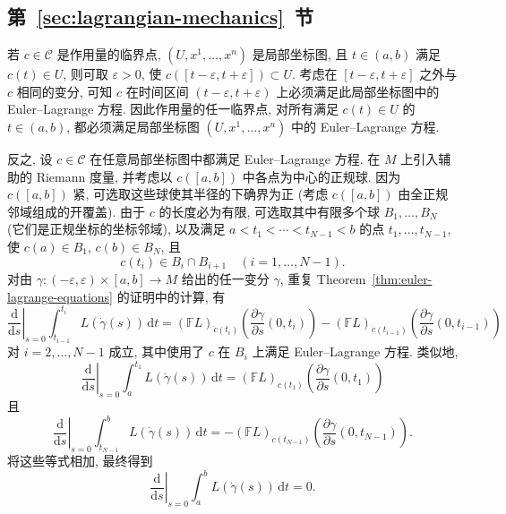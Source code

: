 \subsection{\texorpdfstring{第~\ref{sec:lagrangian-mechanics}~节}{Lagrange 力学}}\label{subsec:solutions-lagrangian-mechanics}

\begin{description}[font=\normalfont,leftmargin=2em,labelwidth=1.5em]
若 $c\in\mathcal C$ 是作用量的临界点, $(U,x^1,\ldots,x^n)$ 是局部坐标图, 且 $t\in(a,b)$ 满足 $c(t)\in U$, 则可取 $\varepsilon>0$, 使 $c([t-\varepsilon,t+\varepsilon])\subset U$. 考虑在 $[t-\varepsilon,t+\varepsilon]$ 之外与 $c$ 相同的变分, 可知 $c$ 在时间区间 $(t-\varepsilon,t+\varepsilon)$ 上必须满足此局部坐标图中的 Euler–Lagrange 方程. 因此作用量的任一临界点, 对所有满足 $c(t)\in U$ 的 $t\in(a,b)$, 都必须满足局部坐标图 $(U,x^1,\ldots,x^n)$ 中的 Euler–Lagrange 方程.

反之, 设 $c\in\mathcal C$ 在任意局部坐标图中都满足 Euler–Lagrange 方程. 在 $M$ 上引入辅助的 Riemann 度量, 并考虑以 $c([a,b])$ 中各点为中心的正规球. 因为 $c([a,b])$ 紧, 可选取这些球使其半径的下确界为正 (考虑 $c([a,b])$ 由全正规邻域组成的开覆盖). 由于 $c$ 的长度必为有限, 可选取其中有限多个球 $B_1,\ldots,B_N$ (它们是正规坐标的坐标邻域), 以及满足 $a<t_1<\cdots<t_{N-1}<b$ 的点 $t_1,\ldots,t_{N-1}$, 使 $c(a)\in B_1$, $c(b)\in B_N$, 且
\[
  c(t_i)\in B_i\cap B_{i+1}\quad(i=1,\ldots,N-1).
\]
对由 $\gamma:(-\varepsilon,\varepsilon)\times[a,b]\to M$ 给出的任一变分 $\gamma$, 重复 Theorem~\ref{thm:euler-lagrange-equations} 的证明中的计算, 有
\[
  \left.\frac{\mathrm{d}}{\mathrm{d}s}\right|_{s=0}
     \int_{t_{i-1}}^{t_i}L(\dot\gamma(s))\,\mathrm{d}t
    =(\mathbb FL)_{\dot c(t_i)}\left(\frac{\partial\gamma}{\partial s}(0,t_i)\right)
     -(\mathbb FL)_{\dot c(t_{i-1})}\left(\frac{\partial\gamma}{\partial s}(0,t_{i-1})\right)
\]
对 $i=2,\ldots,N-1$ 成立, 其中使用了 $c$ 在 $B_i$ 上满足 Euler–Lagrange 方程. 类似地,
\[
  \left.\frac{\mathrm{d}}{\mathrm{d}s}\right|_{s=0}
     \int_a^{t_1}L(\dot\gamma(s))\,\mathrm{d}t
   =(\mathbb FL)_{\dot c(t_1)}\left(\frac{\partial\gamma}{\partial s}(0,t_1)\right)
\]
且
\[
  \left.\frac{\mathrm{d}}{\mathrm{d}s}\right|_{s=0}
     \int_{t_{N-1}}^b L(\dot\gamma(s))\,\mathrm{d}t
   =-(\mathbb FL)_{\dot c(t_{N-1})}\left(\frac{\partial\gamma}{\partial s}(0,t_{N-1})\right).
\]
将这些等式相加, 最终得到
\[
  \left.\frac{\mathrm{d}}{\mathrm{d}s}\right|_{s=0}\int_a^b L(\dot\gamma(s))\,\mathrm{d}t=0.
\]


\end{description}
